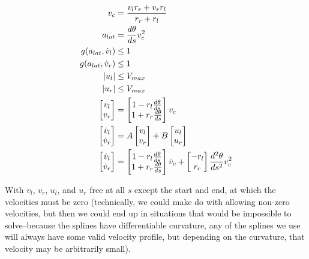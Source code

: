 \documentclass{article}
\begin{document}
\begin{align*}
v_c &= \frac{v_l r_r + v_r r_l}{r_r + r_l} \\
a_{lat} &= \frac{d\theta}{ds} v_c^2 \\
g(a_{lat}, \dot{v}_l) &\le 1 \\
g(a_{lat}, \dot{v}_r) &\le 1 \\
\abs{u_l} &\le V_{max} \\
\abs{u_r} &\le V_{max} \\
\begin{bmatrix} v_l \\ v_r \end{bmatrix} &= \begin{bmatrix} 1 - r_l
    \frac{d\theta}{ds} \\ 1 + r_r \frac{d\theta}{ds}
\end{bmatrix} v_c \\
\begin{bmatrix} \dot{v}_l \\ \dot{v}_r \end{bmatrix} &=
   A \begin{bmatrix} v_l \\ v_r \end{bmatrix} + B \begin{bmatrix} u_l \\ u_r
   \end{bmatrix} \\
\begin{bmatrix} \dot{v}_l \\ \dot{v}_r \end{bmatrix} &=
  \begin{bmatrix} 1 - r_l \frac{d\theta}{ds} \\ 1 + r_r \frac{d\theta}{ds}
  \end{bmatrix} \dot{v}_c +   \begin{bmatrix} -r_l \\ r_r \end{bmatrix} \frac{d^2\theta}{ds^2} v_c^2 \\
\end{align*}

With $v_l$, $v_r$, $u_l$, and $u_r$ free at all $s$ except the start and end, at
which the velocities must
be zero (technically, we could make do with allowing non-zero velocities, but
then we could end up in situations that would be impossible to solve--because
the splines have differentiable curvature, any of the splines we use will always
have some valid velocity profile, but depending on the curvature, that velocity
may be arbitrarily small).
\end{document}
